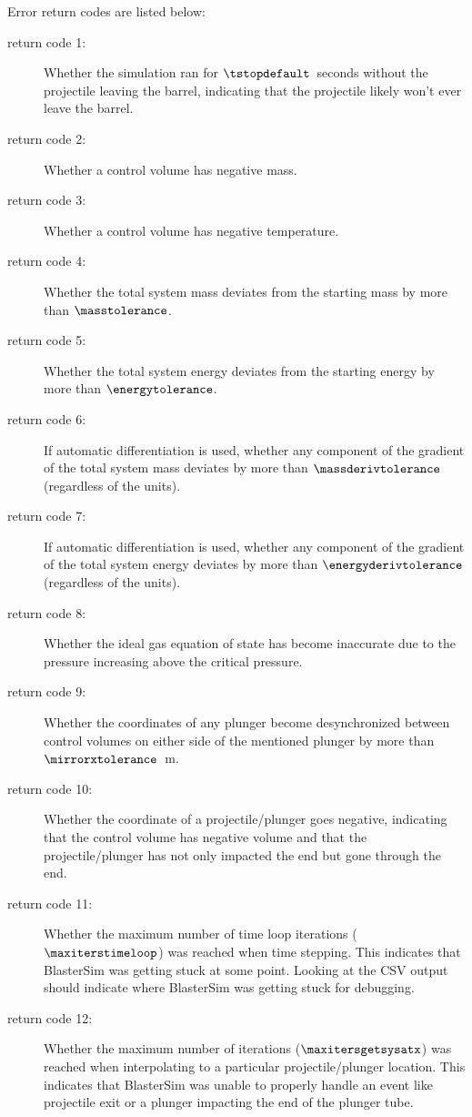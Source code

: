 Error return codes are listed below:
\begin{description}
\item[return code 1:] Whether the simulation ran for $\tstopdefault$~seconds without the projectile leaving the barrel, indicating that the projectile likely won't ever leave the barrel.
\item[return code 2:] Whether a control volume has negative mass.
\item[return code 3:] Whether a control volume has negative temperature.
\item[return code 4:] Whether the total system mass deviates from the starting mass by more than $\masstolerance$.
\item[return code 5:] Whether the total system energy deviates from the starting energy by more than $\energytolerance$.
\item[return code 6:] If automatic differentiation is used, whether any component of the gradient of the total system mass deviates by more than $\massderivtolerance$ (regardless of the units).
\item[return code 7:] If automatic differentiation is used, whether any component of the gradient of the total system energy deviates by more than $\energyderivtolerance$ (regardless of the units).
\item[return code 8:] Whether the ideal gas equation of state has become inaccurate due to the pressure increasing above the critical pressure.
\item[return code 9:] Whether the coordinates of any plunger become desynchronized between control volumes on either side of the mentioned plunger by more than $\mirrorxtolerance$~m.
\item[return code 10:] Whether the coordinate of a projectile/plunger goes negative, indicating that the control volume has negative volume and that the projectile/plunger has not only impacted the end but gone through the end.
\item[return code 11:] Whether the maximum number of time loop iterations ($\maxiterstimeloop$) was reached when time stepping.
This indicates that BlasterSim was getting stuck at some point.
Looking at the CSV output should indicate where BlasterSim was getting stuck for debugging.
\item[return code 12:] Whether the maximum number of iterations ($\maxitersgetsysatx$) was reached when interpolating to a particular projectile/plunger location.
This indicates that BlasterSim was unable to properly handle an event like projectile exit or a plunger impacting the end of the plunger tube.

\end{description}
